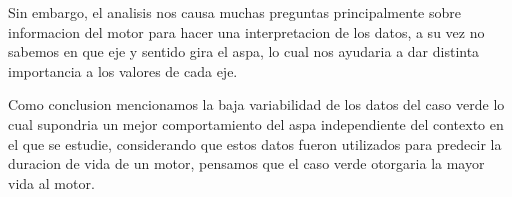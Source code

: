 \documentclass[
]{article}
\begin{document}
Sin embargo, el analisis nos causa muchas preguntas principalmente sobre
informacion del motor para hacer una interpretacion de los datos, a su
vez no sabemos en que eje y sentido gira el aspa, lo cual nos ayudaria a
dar distinta importancia a los valores de cada eje.

Como conclusion mencionamos la baja variabilidad de los datos del caso
verde lo cual supondria un mejor comportamiento del aspa independiente
del contexto en el que se estudie, considerando que estos datos fueron
utilizados para predecir la duracion de vida de un motor, pensamos que
el caso verde otorgaria la mayor vida al motor.
\end{document}
